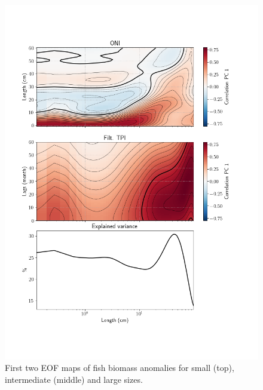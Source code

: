 \begin{figure}
    \centering
    \includegraphics[width=\textwidth]{figs/correlations_eof_oni_tpi_eof_1.png}
    \caption{First two EOF maps of fish biomass anomalies for small (top), intermediate (middle) and large sizes.}
    \label{fig:pc_corrs}
\end{figure}

